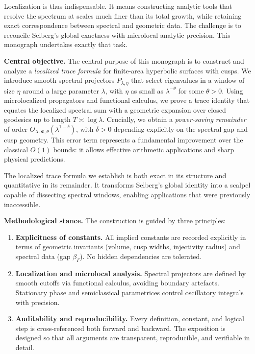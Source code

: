 Localization is thus indispensable. It means constructing analytic tools that
resolve the spectrum at scales much finer than its total growth, while retaining
exact correspondence between spectral and geometric data. The challenge is to
reconcile Selberg’s global exactness with microlocal analytic precision. This
monograph undertakes exactly that task.

\medskip

\noindent\textbf{Central objective.}
The central purpose of this monograph is to construct and analyze a
\emph{localized trace formula} for finite-area hyperbolic surfaces with cusps.
We introduce smooth spectral projectors $P_{\lambda,\eta}$ that select
eigenvalues in a window of size $\eta$ around a large parameter $\lambda$,
with $\eta$ as small as $\lambda^{-\theta}$ for some $\theta>0$. Using
microlocalized propagators and functional calculus, we prove a trace identity
that equates the localized spectral sum with a geometric expansion over closed
geodesics up to length $T\asymp\log\lambda$. Crucially, we obtain a
\emph{power-saving remainder} of order $O_{X,\Phi,\theta}(\lambda^{1-\delta})$,
with $\delta>0$ depending explicitly on the spectral gap and cusp geometry.
This error term represents a fundamental improvement over the classical $O(1)$
bounds: it allows effective arithmetic applications and sharp physical
predictions.

The localized trace formula we establish is both exact in its structure and
quantitative in its remainder. It transforms Selberg’s global identity into a
scalpel capable of dissecting spectral windows, enabling applications that were
previously inaccessible.

\medskip

\noindent\textbf{Methodological stance.}
The construction is guided by three principles:

\begin{enumerate}[label=\arabic*.]
  \item \textbf{Explicitness of constants.}
  All implied constants are recorded explicitly in terms of geometric invariants
  (volume, cusp widths, injectivity radius) and spectral data (gap $\beta_\Gamma$).
  No hidden dependencies are tolerated.

  \item \textbf{Localization and microlocal analysis.}
  Spectral projectors are defined by smooth cutoffs via functional calculus,
  avoiding boundary artefacts. Stationary phase and semiclassical parametrices
  control oscillatory integrals with precision.

  \item \textbf{Auditability and reproducibility.}
  Every definition, constant, and logical step is cross-referenced both forward
  and backward. The exposition is designed so that all arguments are transparent,
  reproducible, and verifiable in detail.
\end{enumerate}


